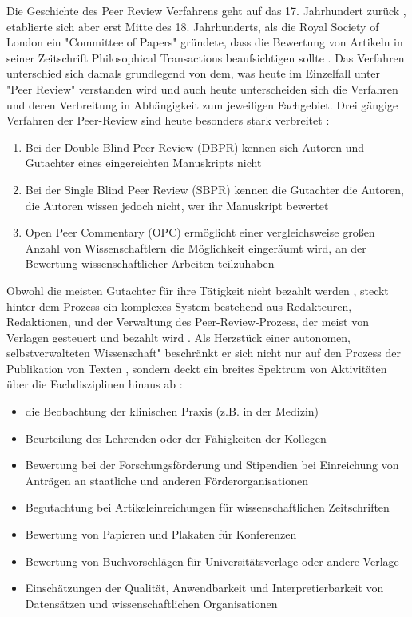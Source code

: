 Die Geschichte des Peer Review Verfahrens geht auf das 17. Jahrhundert zurück \cite{Kronick_1978}, etablierte sich aber erst Mitte des 18. Jahrhunderts, als die Royal Society of London ein "Committee of Papers" gründete, dass die Bewertung von Artikeln in seiner Zeitschrift Philosophical Transactions beaufsichtigen sollte \cite{Kronick_1990}. Das Verfahren unterschied sich damals grundlegend von dem, was heute im Einzelfall unter "Peer Review" verstanden wird und auch heute unterscheiden sich die Verfahren und deren Verbreitung in Abhängigkeit zum jeweiligen Fachgebiet. Drei gängige Verfahren der Peer-Review sind heute besonders stark verbreitet \cite{mueller_2009_peerreview}:
\begin{enumerate}
\item Bei der Double Blind Peer Review (DBPR) kennen sich Autoren und Gutachter eines eingereichten Manuskripts nicht
\item Bei der Single Blind Peer Review (SBPR) kennen die Gutachter die Autoren, die Autoren wissen jedoch nicht, wer ihr Manuskript bewertet
\item Open Peer Commentary (OPC) ermöglicht einer vergleichsweise großen Anzahl von Wissenschaftlern die Möglichkeit eingeräumt wird, an der Bewertung wissenschaftlicher Arbeiten teilzuhaben
\end{enumerate}

Obwohl die meisten Gutachter für ihre Tätigkeit nicht bezahlt werden \cite{yiotis_2013_open}, steckt hinter dem Prozess ein komplexes System bestehend aus Redakteuren, Redaktionen, und der Verwaltung des Peer-Review-Prozess, der meist von Verlagen gesteuert und bezahlt wird \cite{Bargheer_2015} \cite{mueller_2009_peerreview} \cite{Baggs_2006}. Als Herzstück einer autonomen, selbstverwalteten Wissenschaft" \cite{suchen_Hornbostel_2006} beschränkt er sich nicht nur auf den Prozess der Publikation von Texten \cite{mueller_2009_peerreview}, sondern deckt ein breites Spektrum von Aktivitäten über die Fachdisziplinen hinaus ab \cite{Lee_2012}:
\begin{itemize}
\item die Beobachtung der klinischen Praxis (z.B. in der Medizin)
\item Beurteilung des Lehrenden oder der Fähigkeiten der Kollegen
\item Bewertung bei der Forschungsförderung und Stipendien bei Einreichung von Anträgen an staatliche und anderen Förderorganisationen
\item Begutachtung bei Artikeleinreichungen für wissenschaftlichen Zeitschriften
\item Bewertung von Papieren und Plakaten für Konferenzen
\item Bewertung von Buchvorschlägen für Universitätsverlage oder andere Verlage
\item Einschätzungen der Qualität, Anwendbarkeit und Interpretierbarkeit von Datensätzen und wissenschaftlichen Organisationen
\end{itemize}

